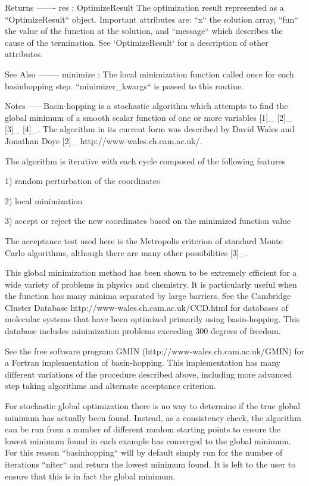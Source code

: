 \begin{DoxyVerb}
Returns
-------
res : OptimizeResult
    The optimization result represented as a ``OptimizeResult`` object.  Important
    attributes are: ``x`` the solution array, ``fun`` the value of the
    function at the solution, and ``message`` which describes the cause of
    the termination. See `OptimizeResult` for a description of other attributes.

See Also
--------
minimize :
    The local minimization function called once for each basinhopping step.
    ``minimizer_kwargs`` is passed to this routine.

Notes
-----
Basin-hopping is a stochastic algorithm which attempts to find the global
minimum of a smooth scalar function of one or more variables [1]_ [2]_ [3]_
[4]_.  The algorithm in its current form was described by David Wales and
Jonathan Doye [2]_ http://www-wales.ch.cam.ac.uk/.

The algorithm is iterative with each cycle composed of the following
features

1) random perturbation of the coordinates

2) local minimization

3) accept or reject the new coordinates based on the minimized function
   value

The acceptance test used here is the Metropolis criterion of standard Monte
Carlo algorithms, although there are many other possibilities [3]_.

This global minimization method has been shown to be extremely efficient
for a wide variety of problems in physics and chemistry.  It is
particularly useful when the function has many minima separated by large
barriers. See the Cambridge Cluster Database
http://www-wales.ch.cam.ac.uk/CCD.html for databases of molecular systems
that have been optimized primarily using basin-hopping.  This database
includes minimization problems exceeding 300 degrees of freedom.

See the free software program GMIN (http://www-wales.ch.cam.ac.uk/GMIN) for
a Fortran implementation of basin-hopping.  This implementation has many
different variations of the procedure described above, including more
advanced step taking algorithms and alternate acceptance criterion.

For stochastic global optimization there is no way to determine if the true
global minimum has actually been found. Instead, as a consistency check,
the algorithm can be run from a number of different random starting points
to ensure the lowest minimum found in each example has converged to the
global minimum.  For this reason ``basinhopping`` will by default simply
run for the number of iterations ``niter`` and return the lowest minimum
found.  It is left to the user to ensure that this is in fact the global
minimum.


\end{DoxyVerb}
